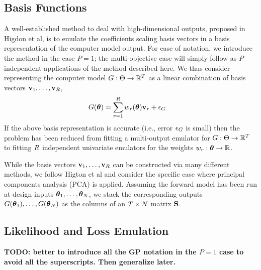 \documentclass[12pt]{article}
\begin{document}
\subsection{Basis Functions}
A well-established method to deal with high-dimensional outputs, proposed in Higdon et al, is to emulate the coefficients scaling basis vectors in a basis 
representation of the computer model output. For ease of notation, we introduce the method in the case $P = 1$; the multi-objective case will simply follow 
as $P$ independent applications of the method described here. We thus consider representing the computer model $G: \Theta \to \mathbb{R}^{T}$ as a linear 
combination of basis vectors $\mathbf{v}_1, \dots, \mathbf{v}_{R}$,
\begin{align}
G(\boldsymbol{\theta}) &= \sum_{r = 1}^{R} w_{r}(\boldsymbol{\theta}) \mathbf{v} _{r} + \epsilon_{G}
\end{align}
If the above basis representation is accurate (i.e., error $\epsilon_{G}$ is small) then the problem has been reduced from fitting a multi-output emulator for
$G: \Theta \to \mathbb{R}^{T}$ to fitting $R$ independent univariate emulators for the weights $w_{r}: \boldsymbol{\theta} \to \mathbb{R}$. 

While the basis vectors $\mathbf{v}_1, \dots, \mathbf{v}_{R}$ can be constructed via many different methods, we follow Higton et al and 
consider the specific case where principal components analysis (PCA) is applied. Assuming the forward model has been run at design inputs $\boldsymbol{\theta}_1, \dots, \boldsymbol{\theta}_N$, we 
stack the corresponding outputs $G(\boldsymbol{\theta}_1), \dots, G(\boldsymbol{\theta}_N)$ as the columns of an $T \times N$
matrix $\mathbf{S}$.

\subsection{Likelihood and Loss Emulation}
\textbf{TODO: better to introduce all the GP notation in the $P = 1$ case to avoid all the superscripts. Then generalize later.}
\end{document}
